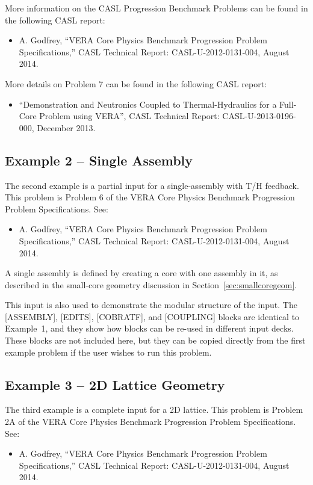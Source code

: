 \documentclass{vera-ornltm}
\begin{document}
More information on the CASL Progression Benchmark Problems can be found in the following CASL report:
\begin{itemize}
\item A. Godfrey, ``VERA Core Physics Benchmark Progression Problem Specifications,''
CASL Technical Report: CASL-U-2012-0131-004, August 2014.
\end{itemize}

More details on Problem 7 can be found in the following CASL report:
\begin{itemize}
\item ``Demonstration and Neutronics Coupled to Thermal-Hydraulics for a Full-Core Problem using VERA'',
CASL Technical Report: CASL-U-2013-0196-000, December 2013.
\end{itemize}



\subsection{Example 2 -- Single Assembly}
The second example is a partial input for a single-assembly with T/H feedback.
This problem is Problem 6 of the VERA Core Physics Benchmark Progression Problem Specifications.  See:
\begin{itemize}
\item A. Godfrey, ``VERA Core Physics Benchmark Progression Problem Specifications,''
CASL Technical Report: CASL-U-2012-0131-004, August 2014.
\end{itemize}

A single assembly is defined by creating a core with one assembly in it,
as described in the small-core geometry discussion in Section~\ref{sec:smallcoregeom}.

This input is also used to demonstrate the modular structure of the input.  The [ASSEMBLY],  [EDITS],
[COBRATF], and [COUPLING] blocks are identical to Example~1, and they show how blocks
can be re-used in different input decks.
These blocks are not included here, but they can be copied directly from the first
example problem if the user wishes to run this problem.



\subsection{Example 3 -- 2D Lattice Geometry}
The third example is a complete input for a 2D lattice.
This problem is Problem 2A of the VERA Core Physics Benchmark Progression Problem Specifications. See:
\begin{itemize}
\item A. Godfrey, ``VERA Core Physics Benchmark Progression Problem Specifications,''
CASL Technical Report: CASL-U-2012-0131-004, August 2014.
\end{itemize}
\end{document}
